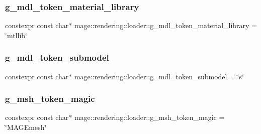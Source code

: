 \hypertarget{namespacemage_1_1rendering_1_1loader_adb56e9576f7d7684cc193d5f8b2a3af3}{}\label{namespacemage_1_1rendering_1_1loader_adb56e9576f7d7684cc193d5f8b2a3af3} 
\subsubsection{\texorpdfstring{g\+\_\+mdl\+\_\+token\+\_\+material\+\_\+library}{g\_mdl\_token\_material\_library}}
{\footnotesize\ttfamily constexpr const char$\ast$ mage\+::rendering\+::loader\+::g\+\_\+mdl\+\_\+token\+\_\+material\+\_\+library = \char`\"{}mtllib\char`\"{}}

\hypertarget{namespacemage_1_1rendering_1_1loader_a3a2351be56243df9b8d5eb68f7f271bd}{}\label{namespacemage_1_1rendering_1_1loader_a3a2351be56243df9b8d5eb68f7f271bd} 
\subsubsection{\texorpdfstring{g\+\_\+mdl\+\_\+token\+\_\+submodel}{g\_mdl\_token\_submodel}}
{\footnotesize\ttfamily constexpr const char$\ast$ mage\+::rendering\+::loader\+::g\+\_\+mdl\+\_\+token\+\_\+submodel = \char`\"{}s\char`\"{}}

\hypertarget{namespacemage_1_1rendering_1_1loader_a3308c71aa50caf9235118760684ad3da}{}\label{namespacemage_1_1rendering_1_1loader_a3308c71aa50caf9235118760684ad3da} 
\subsubsection{\texorpdfstring{g\+\_\+msh\+\_\+token\+\_\+magic}{g\_msh\_token\_magic}}
{\footnotesize\ttfamily constexpr const char$\ast$ mage\+::rendering\+::loader\+::g\+\_\+msh\+\_\+token\+\_\+magic = \char`\"{}M\+A\+G\+Emesh\char`\"{}}

